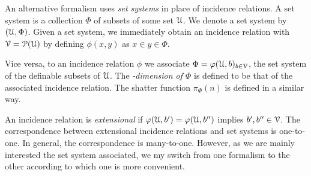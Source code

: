 \documentclass[sputnik.tex]{subfiles}
\begin{document}
An alternative formalism uses \emph{set systems\/} in place of incidence relations.
A set system is a collection $\Phi$ of subsets of some set $\EuScript U$.
We denote a set system by $(\EuScript U,\Phi)$.
Given a set system, we immediately obtain an incidence relation with $\EuScript V=\EuScript P(\EuScript U)$ by defining $\phi(x,y)$ as $x\in y\in\Phi$.

Vice versa, to an incidence relation $\phi$ we associate $\Phi=\varphi(\EuScript U,b)_{b\in\EuScript V}$, the set system of the definable subsets of $\EuScript U$.
The \emph{\vc-dimension of $\Phi$} is defined to be that of the associated incidence relation.
The shatter function \emph{$\pi_\Phi(n)$\/} is defined in a similar way.

An incidence relation is \emph{extensional\/} if $\varphi(\EuScript U,b')=\varphi(\EuScript U,b'')$ implies $b',b''\in\EuScript V$.
The correspondence between extensional incidence relations and set systems is one-to-one.
In general, the correspondence is many-to-one.
However, as we are mainly interested the set system associated, we my switch from one formalism to the other according to which one is more convenient.

\end{document}
